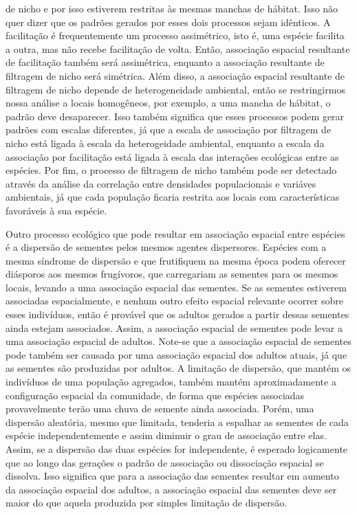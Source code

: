 \documentclass[twoside,12pt,a4paper]{report}
\begin{document}
de nicho e por isso estiverem restritas às mesmas manchas de hábitat. Isso não quer dizer que
os padrões gerados por esses dois processos sejam idênticos. A facilitação é frequentemente
um processo assimétrico, isto é, uma espécie facilita a outra, mas não recebe facilitação de
volta. Então, associação espacial resultante de facilitação também será assimétrica, enquanto
a associação resultante de filtragem de nicho será simétrica. Além disso, a associação
espacial resultante de filtragem de nicho depende de heterogeneidade ambiental, então se
restringirmos nossa análise a locais homogêneos, por exemplo, a uma mancha de hábitat, o
padrão deve desaparecer. Isso também significa que esses processos podem gerar padrões com
escalas diferentes, já que a escala de associação por filtragem de nicho está ligada à escala
da heterogeidade ambiental, enquanto a escala da associação por facilitação está ligada à
escala das interações ecológicas entre as espécies. Por fim, o processo de filtragem de nicho
também pode ser detectado através da análise da correlação entre densidades populacionais e
variáves ambientais, já que cada população ficaria restrita aos locais com características
favoráveis à sua espécie.

Outro processo ecológico que pode resultar em associação espacial entre espécies é a
dispersão de sementes pelos mesmos agentes dispersores. Espécies com a mesma síndrome de
dispersão e que frutifiquem na mesma época podem oferecer diásporos aos mesmos frugívoros, que carregariam as
sementes para os mesmos locais, levando a uma associação espacial das sementes. Se as
sementes estiverem associadas espacialmente, e nenhum outro efeito espacial relevante ocorrer
sobre esses indivíduos, então é provável que os adultos gerados a partir dessas sementes ainda estejam
associados. Assim, a associação espacial de sementes pode levar a uma associação espacial de
adultos. Note-se que a associação espacial de sementes pode também ser causada por uma
associação espacial dos adultos atuais, já que as sementes são produzidas por adultos. A
limitação de dispersão, que mantém os indivíduos de uma população agregados, também mantém
aproximadamente a configuração espacial da comunidade, de forma que espécies associadas
provavelmente terão uma chuva de semente ainda associada. Porém, uma dispersão aleatória,
mesmo que limitada,
tenderia a espalhar as sementes de cada espécie independentemente e assim diminuir o grau de
associação entre elas. Assim, se a dispersão das duas espécies for independente, é esperado
logicamente que ao longo das
gerações o padrão de associação ou dissociação espacial se dissolva. Isso significa que para
a associação das sementes resultar em aumento da associação espacial dos adultos, a
associação espacial das sementes deve ser maior do que aquela produzida por simples limitação
de dispersão.
\end{document}

